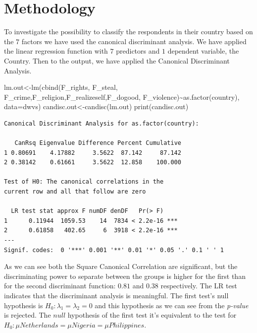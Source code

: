 \documentclass[
  11pt,
]{article}
\newenvironment{Shaded}{\begin{snugshade}}{\end{snugshade}}
\newcommand{\AttributeTok}[1]{\textcolor[rgb]{0.77,0.63,0.00}{#1}}
\newcommand{\FunctionTok}[1]{\textcolor[rgb]{0.00,0.00,0.00}{#1}}
\newcommand{\NormalTok}[1]{#1}
\newcommand{\OtherTok}[1]{\textcolor[rgb]{0.56,0.35,0.01}{#1}}
\newcommand{\SpecialCharTok}[1]{\textcolor[rgb]{0.00,0.00,0.00}{#1}}
\begin{document}
\hypertarget{methodology}{%
\section{Methodology}\label{methodology}}

To investigate the possibility to classify the respondents in their country based on the \(7\) factors we have used the canonical discriminant analysis. We have applied the linear regression function with \(7\) predictors and \(1\) dependent variable, the Country. Then to the output, we have applied the Canonical Discriminant Analysis.

\begin{Shaded}
\begin{Highlighting}[]
\NormalTok{lm.out}\OtherTok{\textless{}{-}}\FunctionTok{lm}\NormalTok{(}\FunctionTok{cbind}\NormalTok{(F\_rights, F\_steal, F\_crime,F\_religion,F\_realizeself,F\_dogood,}
\NormalTok{                 F\_violence)}\SpecialCharTok{\textasciitilde{}}\FunctionTok{as.factor}\NormalTok{(country), }\AttributeTok{data=}\NormalTok{dwvs)}
\NormalTok{candisc.out}\OtherTok{\textless{}{-}}\FunctionTok{candisc}\NormalTok{(lm.out)}
\FunctionTok{print}\NormalTok{(candisc.out)}
\end{Highlighting}
\end{Shaded}

\begin{verbatim}
Canonical Discriminant Analysis for as.factor(country):

   CanRsq Eigenvalue Difference Percent Cumulative
1 0.80691    4.17882     3.5622  87.142     87.142
2 0.38142    0.61661     3.5622  12.858    100.000

Test of H0: The canonical correlations in the 
current row and all that follow are zero

  LR test stat approx F numDF denDF   Pr(> F)    
1      0.11944  1059.53    14  7834 < 2.2e-16 ***
2      0.61858   402.65     6  3918 < 2.2e-16 ***
---
Signif. codes:  0 '***' 0.001 '**' 0.01 '*' 0.05 '.' 0.1 ' ' 1
\end{verbatim}

As we can see both the Square Canonical Correlation are significant, but the discriminating power to separate between the groups is higher for the first than for the second discriminant function: \(0.81\) and \(0.38\) respectively.
The LR test indicates that the discriminant analysis is meaningful. The first test's null hypothesis is \(H_{0}: \lambda_{1}=\lambda_{2}=0\) and this hypothesis as we can see from the \emph{p-value} is rejected. The \(null\) hypothesis of the first test it's equivalent to the test for \(H_{0}: \mu Netherlands = \mu Nigeria = \mu Philippines\).
\end{document}

